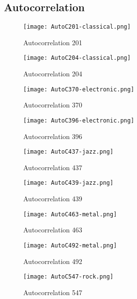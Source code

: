 \documentclass{article} %
\begin{document}
\subsection{Autocorrelation}
\label{sec:autocfig}

\begin{figure}[H]
\centering
\texttt{[image: AutoC201-classical.png]}
\caption{Autocorrelation 201}
\label{fig:auto201_1}
\end{figure}

\begin{figure}[H]
\centering
\texttt{[image: AutoC204-classical.png]}
\caption{Autocorrelation 204}
\label{fig:auto204_1}
\end{figure}


\begin{figure}[H]
\centering
\texttt{[image: AutoC370-electronic.png]}
\caption{Autocorrelation 370}
\label{fig:auto370_1}
\end{figure}

\begin{figure}[H]
\centering
\texttt{[image: AutoC396-electronic.png]}
\caption{Autocorrelation 396}
\label{fig:auto396_1}
\end{figure}

\begin{figure}[H]
\centering
\texttt{[image: AutoC437-jazz.png]}
\caption{Autocorrelation 437}
\label{fig:auto437_1}
\end{figure}

\begin{figure}[H]
\centering
\texttt{[image: AutoC439-jazz.png]}
\caption{Autocorrelation 439}
\label{fig:auto439_1}
\end{figure}

\begin{figure}[H]
\centering
\texttt{[image: AutoC463-metal.png]}
\caption{Autocorrelation 463}
\label{fig:auto463_1}
\end{figure}

\begin{figure}[H]
\centering
\texttt{[image: AutoC492-metal.png]}
\caption{Autocorrelation 492}
\label{fig:auto492_1}
\end{figure}

\begin{figure}[H]
\centering
\texttt{[image: AutoC547-rock.png]}
\caption{Autocorrelation 547}
\label{fig:auto547_1}
\end{figure}
\end{document}
